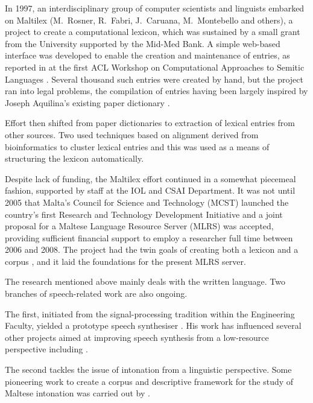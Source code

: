 \begin{multicols}{2}
In 1997, an interdisciplinary group of computer scientists and linguists  embarked on Maltilex (M.~Rosner, R.~Fabri, J.~Caruana, M.~Montebello and others), a project to create a computational lexicon, which was sustained by a small grant from the University supported by the Mid-Med Bank. A simple web-based interface was developed to enable the creation and maintenance of entries, as reported in \cite{Rosner-et-al:1998} at the first ACL Workshop on Computational Approaches to Semitic Languages \cite{Rosner:1998}. Several thousand such entries were created by hand, but the project ran into legal problems, the compilation of entries having been largely inspired by Joseph Aquilina's existing paper dictionary \cite{Aquilina:1987,Aquilina:1990}.

Effort then shifted from paper dictionaries to extraction of lexical entries from other sources. Two \cite{Dalli:2001, Attard:2005} used techniques based on alignment derived from bioinformatics to cluster lexical entries and this was used as a means of structuring the lexicon automatically. 

Despite lack of funding, the Maltilex effort continued in a somewhat piecemeal fashion, supported by staff at the IOL and CSAI Department. It was not until 2005 that Malta's Council for Science and Technology (MCST) launched the country's first Research and Technology Development Initiative and a joint proposal for a Maltese Language Resource Server (MLRS) was accepted, providing sufficient financial support to employ a researcher full time between 2006 and 2008. The project had the twin goals of creating both a lexicon and a corpus \cite{Rosner:2009}, and it laid the foundations for the present MLRS server.

The research mentioned above mainly deals with the written language. Two branches of speech-related work are also ongoing. 

The first, initiated from the signal-processing tradition within the Engineering Faculty, yielded a prototype speech synthesiser \cite{Micallef:1997}. His work has influenced several other projects aimed at improving speech synthesis from a low-resource perspective including \cite{Calleja:2002, Farrugia:2005, Camilleri:2010, Borg-et-al:2011}.

The second tackles the issue of intonation \cite{Vella:2009} from a linguistic perspective. Some pioneering work to create a corpus and descriptive framework for the study of Maltese intonation was carried out by \cite{Vella-Farrugia:2006}. 
\columnbreak


\end{multicols}
